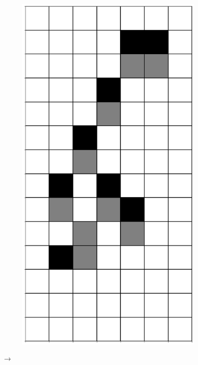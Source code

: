 \documentclass[12pt]{article}
\numberwithin{figure}{section} %
\begin{document}
\begin{figure}[H]
        \begin{subfigure}{0.3\textwidth}
     \centering
     \includegraphics[angle=270,width=\linewidth]{Section4/12.2}
     \subcaption{}
   \end{subfigure}
      {\LARGE$\xrightarrow{}$}
      \newline

\end{figure}
\end{document}
